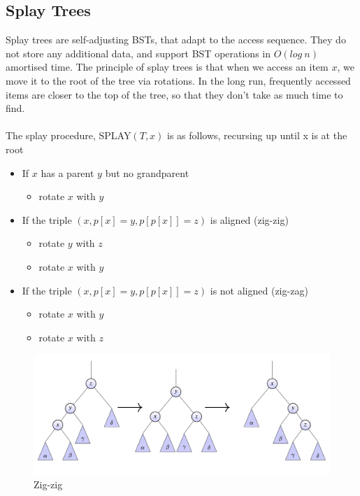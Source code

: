 \documentclass{article}
\theoremstyle{plain}
\theoremstyle{definition}
\begin{document}
    \subsection{Splay Trees}

    Splay trees are self-adjusting BSTs, that adapt to the access sequence. They do not store any additional data, and support BST operations in $O(log \ n)$ amortised time. The principle of splay trees is that when we access an item $x$, we move it to the root of the tree via rotations. In the long run, frequently accessed items are closer to the top of the tree, so that they don't take as much time to find. \\ \\

    \noindent The splay procedure, SPLAY$(T,x)$ is as follows, recursing up until x is at the root
    \begin{itemize}
        \item If $x$ has a parent $y$ but no grandparent
            \begin{itemize}
                \item rotate $x$ with $y$
            \end{itemize}
        \item If the triple $(x, p[x] = y, p[p[x]] = z)$ is aligned (zig-zig)
            \begin{itemize}
                \item rotate $y$ with $z$
                \item rotate $x$ with $y$
            \end{itemize}
        \item If the triple $(x, p[x] = y, p[p[x]] = z)$ is not aligned (zig-zag)
            \begin{itemize}
                \item rotate $x$ with $y$
                \item rotate $x$ with $z$
            \end{itemize}
    \end{itemize}

    \begin{figure}
            \centering
            \includegraphics[width=\linewidth]{images/zigzig.png}
            \caption{Zig-zig}
            \label{fig:zigzig}
    \end{figure}
\end{document}
